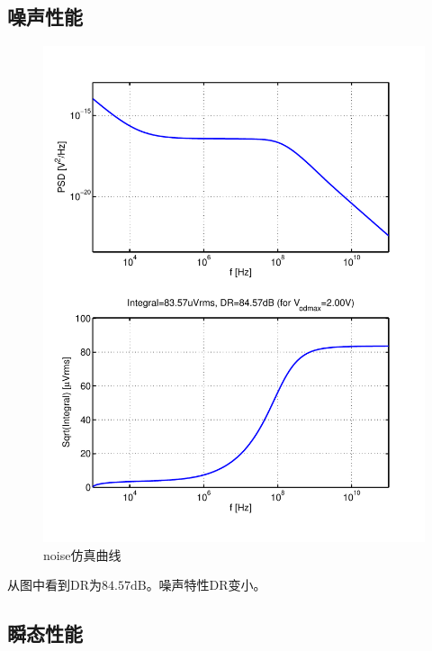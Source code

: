 \documentclass[a4paper]{article}
\newcommand{\udB}{\si{\deci\bel}}
\begin{document}
\subsection{噪声性能}
\begin{figure}[htb]
    \begin{center}
        \includegraphics[width=\textwidth]{slow/noise.pdf}
    \end{center}
    \caption{noise仿真曲线}
    \label{slownoise}
\end{figure}
从图中看到DR为$84.57\udB$。噪声特性DR变小。
\newpage
\subsection{瞬态性能}
\end{document}
